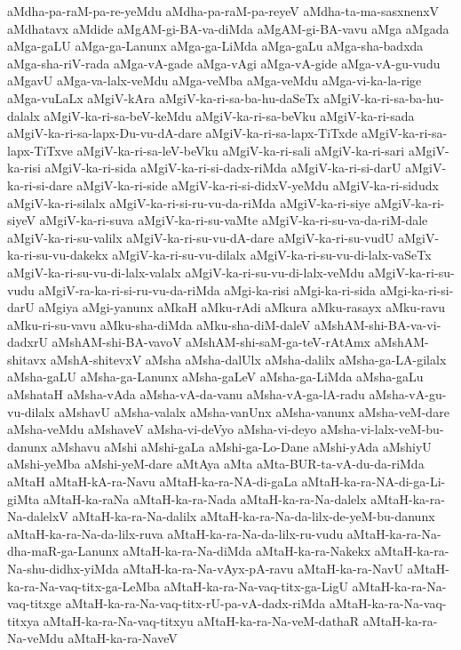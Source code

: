 {aMdha-pa-raM-pa-re-yeMdu
aMdha-pa-raM-pa-reyeV
aMdha-ta-ma-sasxnenxV
aMdhatavx
aMdide
aMgAM-gi-BA-va-diMda
aMgAM-gi-BA-vavu
aMga
aMgada
aMga-gaLU
aMga-ga-Lanunx
aMga-ga-LiMda
aMga-gaLu
aMga-sha-badxda
aMga-sha-riV-rada
aMga-vA-gade
aMga-vAgi
aMga-vA-gide
aMga-vA-gu-vudu
aMgavU
aMga-va-lalx-veMdu
aMga-veMba
aMga-veMdu
aMga-vi-ka-la-rige
aMga-vuLaLx
aMgiV-kAra
aMgiV-ka-ri-sa-ba-hu-daSeTx
aMgiV-ka-ri-sa-ba-hu-dalalx
aMgiV-ka-ri-sa-beV-keMdu
aMgiV-ka-ri-sa-beVku
aMgiV-ka-ri-sada
aMgiV-ka-ri-sa-lapx-Du-vu-dA-dare
aMgiV-ka-ri-sa-lapx-TiTxde
aMgiV-ka-ri-sa-lapx-TiTxve
aMgiV-ka-ri-sa-leV-beVku
aMgiV-ka-ri-sali
aMgiV-ka-ri-sari
aMgiV-ka-risi
aMgiV-ka-ri-sida
aMgiV-ka-ri-si-dadx-riMda
aMgiV-ka-ri-si-darU
aMgiV-ka-ri-si-dare
aMgiV-ka-ri-side
aMgiV-ka-ri-si-didxV-yeMdu
aMgiV-ka-ri-sidudx
aMgiV-ka-ri-silalx
aMgiV-ka-ri-si-ru-vu-da-riMda
aMgiV-ka-ri-siye
aMgiV-ka-ri-siyeV
aMgiV-ka-ri-suva
aMgiV-ka-ri-su-vaMte
aMgiV-ka-ri-su-va-da-riM-dale
aMgiV-ka-ri-su-valilx
aMgiV-ka-ri-su-vu-dA-dare
aMgiV-ka-ri-su-vudU
aMgiV-ka-ri-su-vu-dakekx
aMgiV-ka-ri-su-vu-dilalx
aMgiV-ka-ri-su-vu-di-lalx-vaSeTx
aMgiV-ka-ri-su-vu-di-lalx-valalx
aMgiV-ka-ri-su-vu-di-lalx-veMdu
aMgiV-ka-ri-su-vudu
aMgiV-ra-ka-ri-si-ru-vu-da-riMda
aMgi-ka-risi
aMgi-ka-ri-sida
aMgi-ka-ri-si-darU
aMgiya
aMgi-yanunx
aMkaH
aMku-rAdi
aMkura
aMku-rasayx
aMku-ravu
aMku-ri-su-vavu
aMku-sha-diMda
aMku-sha-diM-daleV
aMshAM-shi-BA-va-vi-dadxrU
aMshAM-shi-BA-vavoV
aMshAM-shi-saM-ga-teV-rAtAmx
aMshAM-shitavx
aMshA-shitevxV
aMsha
aMsha-dalUlx
aMsha-dalilx
aMsha-ga-LA-gilalx
aMsha-gaLU
aMsha-ga-Lanunx
aMsha-gaLeV
aMsha-ga-LiMda
aMsha-gaLu
aMshataH
aMsha-vAda
aMsha-vA-da-vanu
aMsha-vA-ga-lA-radu
aMsha-vA-gu-vu-dilalx
aMshavU
aMsha-valalx
aMsha-vanUnx
aMsha-vanunx
aMsha-veM-dare
aMsha-veMdu
aMshaveV
aMsha-vi-deVyo
aMsha-vi-deyo
aMsha-vi-lalx-veM-bu-danunx
aMshavu
aMshi
aMshi-gaLa
aMshi-ga-Lo-Dane
aMshi-yAda
aMshiyU
aMshi-yeMba
aMshi-yeM-dare
aMtAya
aMta
aMta-BUR-ta-vA-du-da-riMda
aMtaH
aMtaH-kA-ra-Navu
aMtaH-ka-ra-NA-di-gaLa
aMtaH-ka-ra-NA-di-ga-Li-giMta
aMtaH-ka-raNa
aMtaH-ka-ra-Nada
aMtaH-ka-ra-Na-dalelx
aMtaH-ka-ra-Na-dalelxV
aMtaH-ka-ra-Na-dalilx
aMtaH-ka-ra-Na-da-lilx-de-yeM-bu-danunx
aMtaH-ka-ra-Na-da-lilx-ruva
aMtaH-ka-ra-Na-da-lilx-ru-vudu
aMtaH-ka-ra-Na-dha-maR-ga-Lanunx
aMtaH-ka-ra-Na-diMda
aMtaH-ka-ra-Nakekx
aMtaH-ka-ra-Na-shu-didhx-yiMda
aMtaH-ka-ra-Na-vAyx-pA-ravu
aMtaH-ka-ra-NavU
aMtaH-ka-ra-Na-vaq-titx-ga-LeMba
aMtaH-ka-ra-Na-vaq-titx-ga-LigU
aMtaH-ka-ra-Na-vaq-titxge
aMtaH-ka-ra-Na-vaq-titx-rU-pa-vA-dadx-riMda
aMtaH-ka-ra-Na-vaq-titxya
aMtaH-ka-ra-Na-vaq-titxyu
aMtaH-ka-ra-Na-veM-dathaR
aMtaH-ka-ra-Na-veMdu
aMtaH-ka-ra-NaveV
}
